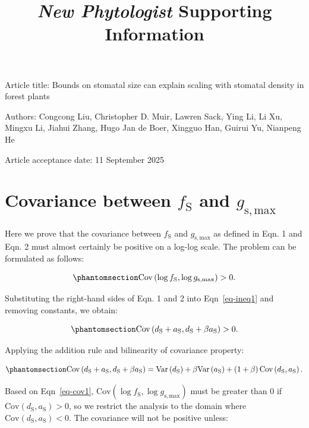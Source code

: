 \documentclass[
  letterpaper,
  DIV=11,
  numbers=noendperiod]{scrartcl}
\title{\emph{New Phytologist} Supporting Information}
\author{}
\date{}
\begin{document}
\maketitle

Article title: Bounds on stomatal size can explain scaling with stomatal
density in forest plants

Authors: Congcong Liu, Christopher D. Muir, Lawren Sack, Ying Li, Li Xu,
Mingxu Li, Jiahui Zhang, Hugo Jan de Boer, Xingguo Han, Guirui Yu,
Nianpeng He

Article acceptance date: 11 September 2025

\section{\texorpdfstring{Covariance between \(f_\text{S}\) and
\(g_\mathrm{s,max}\)}{Covariance between f\_\textbackslash text\{S\} and g\_\textbackslash mathrm\{s,max\}}}\label{covariance-between-f_texts-and-g_mathrmsmax}

Here we prove that the covariance between \(f_\text{S}\) and
\(g_\mathrm{s,max}\) as defined in Eqn. 1 and Eqn. 2 must almost
certainly be positive on a log-log scale. The problem can be formulated
as follows:

\begin{equation}\phantomsection\label{eq-ineq1}{\text{Cov} \left(\log f_\text{S}, \log g_\mathrm{s,max} \right) > 0.}\end{equation}

Substituting the right-hand sides of Eqn. 1 and 2 into
Eqn~\ref{eq-ineq1} and removing constants, we obtain:

\begin{equation}\phantomsection\label{eq-ineq2}{\text{Cov} \left(d_\text{S} + a_\text{S}, d_\text{S} + \beta a_\text{S} \right) > 0.}\end{equation}

Applying the addition rule and bilinearity of covariance property:

\begin{equation}\phantomsection\label{eq-cov1}{\text{Cov} \left(d_\text{S} + a_\text{S}, d_\text{S} + \beta a_\text{S} \right) = \text{Var} \left( d_\text{S} \right) + \beta \text{Var} \left( a_\text{S} \right) + \left(1 + \beta \right) \text{Cov} \left(d_\text{S}, a_\text{S} \right).}\end{equation}

Based on Eqn~\ref{eq-cov1},
\(\text{Cov} \left(\log f_\text{S}, \log g_\mathrm{s,max} \right)\) must
be greater than 0 if
\(\text{Cov} \left(d_\text{S}, a_\text{S} \right) > 0\), so we restrict
the analysis to the domain where
\(\text{Cov} \left(d_\text{S}, a_\text{S} \right) < 0\). The covariance
will not be positive unless:
\end{document}
